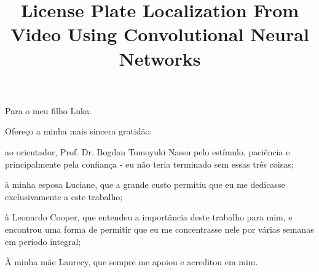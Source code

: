 \documentclass[oneside,a4paper,12pt]{normas-utf-tex}
\title{License Plate Localization From Video Using Convolutional Neural Networks}
\begin{document}
\capa

\folhaderosto


\begin{dedicatoria}
	Para o meu filho Luka.
\end{dedicatoria}

\begin{agradecimentos}
	Ofereço a minha mais sincera gratidão:

	ao orientador, Prof. Dr. Bogdan Tomoyuki Nassu pelo estímulo,
	paciência e principalmente pela confiança - eu não teria terminado
	sem essas três coisas;

	à minha esposa Luciane, que a grande custo permitiu que eu me
	dedicasse exclusivamente a este trabalho;

	à Leonardo Cooper, que entendeu a importância deste trabalho
	para mim, e encontrou uma forma de permitir que eu me concentrasse
	nele por várias semanas em período integral;

	À minha mãe Laurecy, que sempre me apoiou e acreditou em mim.
\end{agradecimentos}

\begin{resumo}
	
\end{resumo}

\begin{abstract}
	
\end{abstract}


\listadefiguras
\listadetabelas
\listadesiglas

\sumario






%
%

%
%
\end{document}
